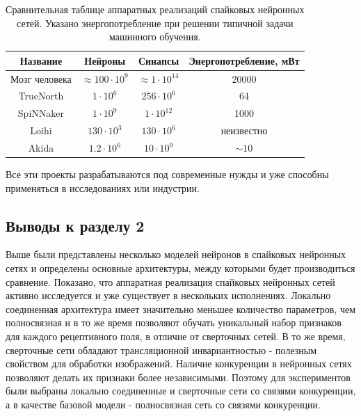 \documentclass[a4paper]{article}
\begin{document}
\begin{table}[h]
 \caption {Сравнительная таблице аппаратных реализаций спайковых нейронных сетей. Указано энергопотребление при решении типичной задачи машинного обучения.}
 \begin{center}
  \begin{tabular}{|c|c|c|c|}
  \hline
  {Название} & {Нейроны} & {Синапсы} & {Энергопотребление, мВт}\\
  \hline
  {Мозг человека} & {$\approx 100 \cdot 10^9$} & {$\approx 1 \cdot 10^{14}$} & {20000}\\
  \hline
  {TrueNorth \cite{TrueNorth}} & {$1 \cdot 10^6$} & {$256 \cdot 10^6$} & {64\footnotemark[1]}\\
  \hline
  {SpiNNaker \cite{SpiNNaker}} & {$1 \cdot 10^9$} & {$1 \cdot 10^{12}$} & {1000\footnotemark[2]}\\
  \hline
  {Loihi \cite{Loihi}} & {$130 \cdot 10^3$} & {$130 \cdot 10^{6}$} & {неизвестно}\\
  \hline
  {Akida \cite{Akida}} & {$1.2 \cdot 10^6$} & {$10 \cdot 10^{9}$} & {$\sim 10$ \footnotemark[3]}\\
  \hline 
  \end{tabular}
 \end{center}
\end{table}


Все эти проекты разрабатываются под современные нужды и уже способны применяться в исследованиях или индустрии.

\subsection*{Выводы к разделу 2}
Выше были представлены несколько моделей нейронов в спайковых нейронных сетях и определены основные архитектуры, между которыми будет производиться сравнение. Показано, что аппаратная реализация спайковых нейронных сетей активно исследуется и уже существует в нескольких исполнениях. Локально соединенная архитектура имеет значительно меньшее количество параметров, чем полносвязная и в то же время позволяют обучать уникальный набор признаков для каждого рецептивного поля, в отличие от сверточных сетей. В то же время, сверточные сети обладают трансляционной инвариантностью - полезным свойством для обработки изображений. Наличие конкуренции в нейронных сетях позволяют делать их признаки более независимыми. Поэтому для экспериментов были выбраны локально соединенные и сверточные сети со связями конкуренции, а в качестве базовой модели - полносвязная сеть со связями конкуренции.
\end{document}
